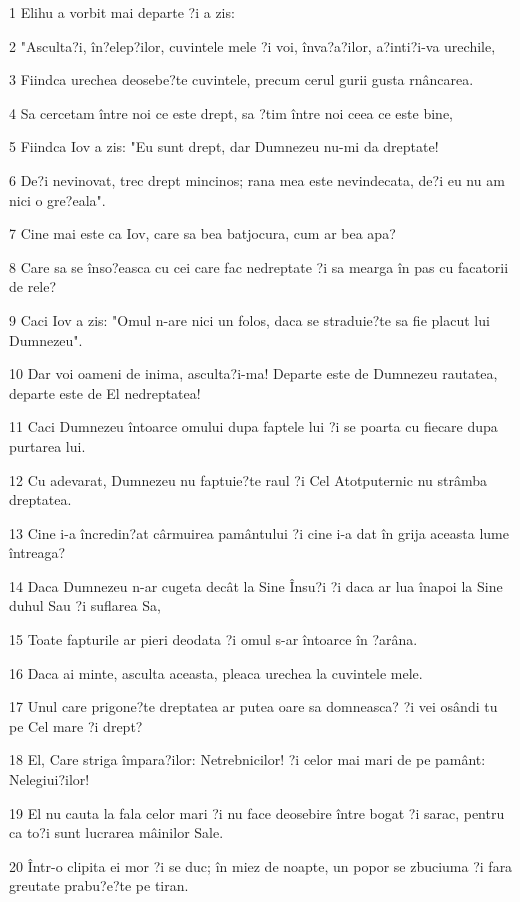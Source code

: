 \par 1 Elihu a vorbit mai departe ?i a zis:
\par 2 "Asculta?i, în?elep?ilor, cuvintele mele ?i voi, înva?a?ilor, a?inti?i-va urechile,
\par 3 Fiindca urechea deosebe?te cuvintele, precum cerul gurii gusta rnâncarea.
\par 4 Sa cercetam între noi ce este drept, sa ?tim între noi ceea ce este bine,
\par 5 Fiindca Iov a zis: "Eu sunt drept, dar Dumnezeu nu-mi da dreptate!
\par 6 De?i nevinovat, trec drept mincinos; rana mea este nevindecata, de?i eu nu am nici o gre?eala".
\par 7 Cine mai este ca Iov, care sa bea batjocura, cum ar bea apa?
\par 8 Care sa se înso?easca cu cei care fac nedreptate ?i sa mearga în pas cu facatorii de rele?
\par 9 Caci Iov a zis: "Omul n-are nici un folos, daca se straduie?te sa fie placut lui Dumnezeu".
\par 10 Dar voi oameni de inima, asculta?i-ma! Departe este de Dumnezeu rautatea, departe este de El nedreptatea!
\par 11 Caci Dumnezeu întoarce omului dupa faptele lui ?i se poarta cu fiecare dupa purtarea lui.
\par 12 Cu adevarat, Dumnezeu nu faptuie?te raul ?i Cel Atotputernic nu strâmba dreptatea.
\par 13 Cine i-a încredin?at cârmuirea pamântului ?i cine i-a dat în grija aceasta lume întreaga?
\par 14 Daca Dumnezeu n-ar cugeta decât la Sine Însu?i ?i daca ar lua înapoi la Sine duhul Sau ?i suflarea Sa,
\par 15 Toate fapturile ar pieri deodata ?i omul s-ar întoarce în ?arâna.
\par 16 Daca ai minte, asculta aceasta, pleaca urechea la cuvintele mele.
\par 17 Unul care prigone?te dreptatea ar putea oare sa domneasca? ?i vei osândi tu pe Cel mare ?i drept?
\par 18 El, Care striga împara?ilor: Netrebnicilor! ?i celor mai mari de pe pamânt: Nelegiui?ilor!
\par 19 El nu cauta la fala celor mari ?i nu face deosebire între bogat ?i sarac, pentru ca to?i sunt lucrarea mâinilor Sale.
\par 20 Într-o clipita ei mor ?i se duc; în miez de noapte, un popor se zbuciuma ?i fara greutate prabu?e?te pe tiran.
